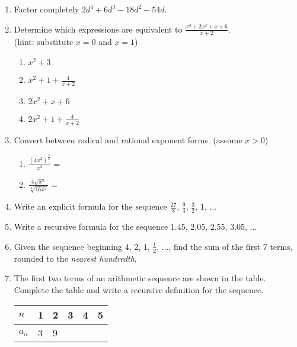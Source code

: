 \documentclass[12pt, twoside]{article}
\begin{document}
\begin{enumerate}[itemsep=0.5cm]
\newpage
\item Factor completely $2d^4+6d^3-18d^2-54d$. \vspace{4cm}

\item Determine which expressions are equivalent to $\displaystyle \frac{x^3+2x^2+x+6}{x+2}$. \\[0.25cm]
    (hint: substitute $x=0$ and $x=1$)
    \begin{multicols}{2}
    \begin{enumerate}
        \item $x^2+3$
        \item $\displaystyle x^2+1 +\frac{4}{x+2}$
        \item $2x^2+x+6$
        \item $\displaystyle 2x^2+1 + \frac{4}{x+2}$
    \end{enumerate}
    \end{multicols} \vspace{3cm}

\item Convert between radical and rational exponent forms. (assume $x > 0$)
    \begin{multicols}{2}
    \begin{enumerate}
        \item $\displaystyle \frac{(4x^2)^{\frac{5}{2}}}{x^{3}} =$
        \item $\displaystyle \frac{4\sqrt{x^5}}{\sqrt[4]{16x^2}} = $
    \end{enumerate}
    \end{multicols} \vspace{2cm}

\newpage
\item Write an explicit formula for the sequence $\frac{27}{8}$, $\frac{9}{4}$, $\frac{3}{2}$, $1$, $\ldots$ \vspace{3cm}

\item Write a recursive formula for the sequence 1.45, 2.05, 2.55, 3.05, $\ldots$ \vspace{3cm}


\item Given the sequence beginning  $4$, 2, $1$, $\frac{1}{2}$, $\ldots$, find the sum of the first 7 terms, rounded to the \emph{nearest hundredth}. \vspace{3cm}

\item The first two terms of an arithmetic sequence are shown in the table. Complete the table and write a recursive definition for the sequence.
\begin{center}
\begin{tabular}{|p{1cm}|p{1cm}|p{1cm}|p{1cm}|p{1cm}|p{1cm}|}
    \hline
    $n$ & 1 & 2 & 3 & 4 & 5 \\
    \hline
    $a_n$ & 3 & 9 & & & \\[0.25cm]
    \hline
\end{tabular}
\end{center}


\end{enumerate}
\end{document}
